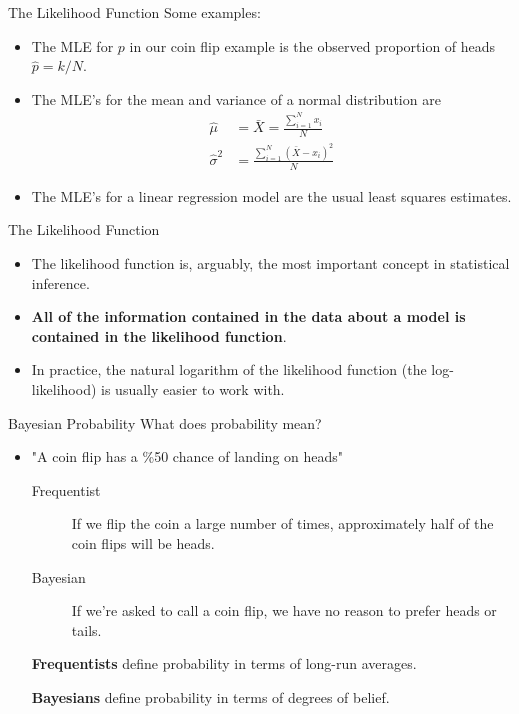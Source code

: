 \documentclass{beamer}
\begin{document}
\begin{frame}{The Likelihood Function}
Some examples:
        \begin{itemize}
                \item The MLE for $p$ in our coin flip example
                          is the observed proportion of heads $\hat{p} = k/N$.
                \item The MLE's for the mean and variance of a normal distribution are
                        \begin{align*}
                                \hat{\mu} &= \bar{X} = \frac{\sum_{i=1}^N x_i}{N} \\
                                \hat{\sigma}^2 &= \frac{\sum_{i=1}^N (\bar{X} - x_i)^2}{N}
                        \end{align*}
                \item The MLE's for a linear regression model are the usual least squares
                          estimates.
        \end{itemize}
\end{frame}

\begin{frame}{The Likelihood Function}
        \begin{itemize}
                \item The likelihood function is, arguably, the most important concept in
                          statistical inference.
                \item \textbf{All of the information contained in the data about a model is 
                               contained in the likelihood function}.
                \item In practice, the natural logarithm of the likelihood function
                         (the log-likelihood) is usually easier to work with.
        \end{itemize}
\end{frame}


\begin{frame}{Bayesian Probability}
What does probability mean? 
    \begin{itemize}
        \item "A coin flip has a \%50 chance of landing on heads"
            \begin{description}
                \item[Frequentist] If we flip the coin a large number of times, approximately
                        half of the coin flips will be heads.
                \item[Bayesian] If we're asked to call a coin flip, we have no reason to 
                        prefer heads or tails.
            \end{description}
\textbf{Frequentists} define probability in terms of long-run averages.\par
\textbf{Bayesians} define probability in terms of degrees of belief. 
    \end{itemize}
\end{frame}
\end{document}
